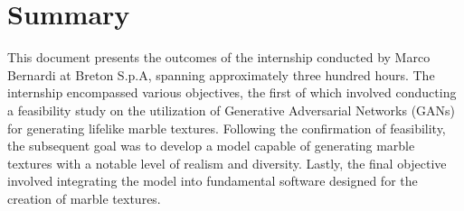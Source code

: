 \cleardoublepage{}
\begingroup
\let\clearpage\relax
\let\cleardoublepage\relax
\let\cleardoublepage\relax

\chapter*{Summary}
This document presents the outcomes of the internship conducted by Marco Bernardi at Breton S.p.A, spanning approximately three hundred hours. 
The internship encompassed various objectives, the first of which involved conducting a feasibility study on the utilization of Generative Adversarial Networks (GANs) for generating lifelike marble textures. 
Following the confirmation of feasibility, the subsequent goal was to develop a model capable of generating marble textures with a notable level of realism and diversity. 
Lastly, the final objective involved integrating the model into fundamental software designed for the creation of marble textures.




\endgroup

\vfill
